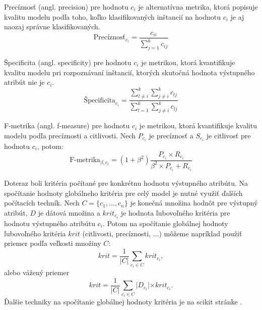 \begin{def-sk}\label{kap1:2.6:2.6.2:Sensitivity}
Precíznosť (angl. precision) pre hodnotu $c_{i}$ je alternatívna metrika, ktorá popisuje kvalitu modelu podľa toho, koľko klasifikovaných inštancií na hodnotu $c_{i}$ je aj naozaj správne klasifikovaných.
\begin{equation}
\mbox{Precíznosť}_{c_{i}} = \dfrac{c_{ii}}{\sum_{j=1}^{k} c_{ij}}
\end{equation}
\end{def-sk}

\begin{def-sk}\label{kap1:2.6:2.6.2:Specificity}
Špecificita (angl. specificity) pre hodnotu $c_{i}$ je metrikou, ktorá kvantifikuje kvalitu modelu pri rozpoznávaní inštancií, ktorých skutočná hodnota výstupného atribút nie je $c_{i}$.
\begin{equation}
\mbox{Špecificita}_{c_{i}} = \dfrac{\sum_{l \ne i}^{k}\sum_{j \ne i}^{k} c_{lj}}{\sum_{l = 1}^{k}\sum_{j \ne i}^{k} c_{lj}}
\end{equation}
\end{def-sk}

\begin{def-sk}[F-metrika]\label{kap1:2.6:2.6.2:Specificity}
F-metrika (angl. f-measure) pre hodnotu $c_{i}$ je metrikou, ktorá kvantifikuje kvalitu modelu podľa precíznosti a citlivosti. Nech $P_{c_{i}}$ je precíznosť a $S_{c_{i}}$ je citlivosť pre hodnotu $c_{i}$, potom:
\begin{equation}
\mbox{F-metrika}_{\beta, c_{i}} = (1 + \beta^2) \dfrac{P_{c_{i}} \times R_{c_{i}}}{\beta^2 \times P_{c_{i}} + R_{c_{i}}}
\end{equation}
\end{def-sk}

Doteraz boli kritéria počítané pre konkrétnu hodnotu výstupného atribútu. Na spočítanie hodnoty globálneho kritéria pre celý model je nutné využiť ďalších počítacích techník. Nech $C = \{c_{1},\ldots,c_{n}\}$ je konečná množina hodnôt pre výstupný atribút, $D$ je dátová množina a $krit_{c_{i}}$ je hodnota ľubovoľného kritéria pre hodnotu výstupného atribútu $c_{i}$. Potom na spočítanie globálnej hodnoty ľubovoľného kritéria $krit$ (citlivosti, precíznosti, $\ldots$) môžeme napríklad použiť priemer podľa veľkosti množiny $C$:
\begin{equation}
krit = \dfrac{1}{\lvert C \lvert} \sum_{c_{i} \in C} krit_{c_{i}},
\end{equation}
alebo vážený priemer
\begin{equation}
krit = \dfrac{1}{\lvert C \lvert} \sum_{c_{i} \in C} \lvert D_{c_{i}} \lvert \times krit_{c_{i}}.
\end{equation}
Ďalšie techniky na spočítanie globálnej hodnoty kritéria je na scikit stránke \cite{online-NAryConfusion}. 


